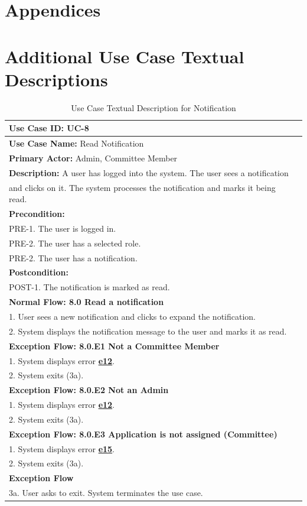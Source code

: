 \documentclass[fontsize=12pt,paper=letter,twoside]{scrartcl}
\begin{document}

\newpage
\section{Appendices}
\appendix

\section{Additional Use Case Textual Descriptions}

\begin{table}[!htb]
\begin{center}
\begin{tabular}{|l|l|}
\hline
\textbf{Use Case ID:} UC-8 \\ \hline
\textbf{Use Case Name:} Read Notification \\ \hline
\textbf {Primary Actor:} Admin, Committee Member \\ \hline
\textbf{Description:} A user has logged into the system. The user sees a notification \\and clicks on it. The system processes the notification and marks it being read.\\ \hline
\textbf{Precondition:}
\\ PRE-1. The user is logged in.
\\ PRE-2. The user has a selected role.
\\ PRE-2. The user has a notification.\\ \hline
\textbf{Postcondition:}
\\ POST-1. The notification is marked as read. \\ \hline
\textbf{Normal Flow: 8.0 Read a notification}
\\ 1. User sees a new notification and clicks to expand the notification.
\\ 2. System displays the notification message to the user and marks it as read.\\ \hline
\textbf{Exception Flow: 8.0.E1 Not a Committee Member}
\\ 1. System displays error  \hyperref[app:error]{\textbf{e12}}.
\\ 2. System exits (3a). \\ \hline 
\textbf{Exception Flow: 8.0.E2 Not an Admin}
\\ 1. System displays error  \hyperref[app:error]{\textbf{e12}}.
\\ 2. System exits (3a). \\ \hline 
\textbf{Exception Flow: 8.0.E3 Application is not assigned (Committee)}
\\ 1. System displays error \hyperref[app:error]{\textbf{e15}}.
\\ 2. System exits (3a). \\ \hline
\textbf{Exception Flow}
\\ 3a. User asks to exit. System terminates the use case.\\ \hline
\end{tabular}
\end{center}
\caption {Use Case Textual Description for Notification}
\label{tbl:uc8td}
\end{table}
\end{document}
